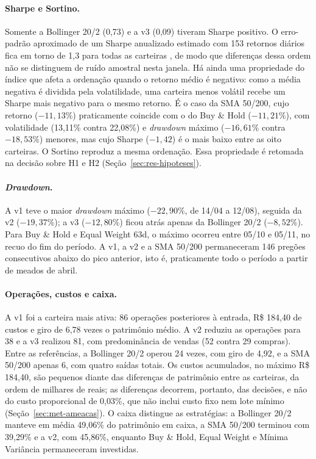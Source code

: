 \documentclass{eic-bcc-tcc}
\begin{document}
\paragraph{Sharpe e Sortino.} Somente a Bollinger 20/2 (0,73) e a v3 (0,09) tiveram Sharpe positivo. O erro-padrão aproximado de um Sharpe anualizado estimado com 153 retornos diários fica em torno de 1,3 para todas as carteiras \citep{Lo2002}, de modo que diferenças dessa ordem não se distinguem de ruído amostral nesta janela. Há ainda uma propriedade do índice que afeta a ordenação quando o retorno médio é negativo: como a média negativa é dividida pela volatilidade, uma carteira menos volátil recebe um Sharpe mais negativo para o mesmo retorno. É o caso da SMA 50/200, cujo retorno ($-11{,}13\%$) praticamente coincide com o do Buy \& Hold ($-11{,}21\%$), com volatilidade (13,11\% contra 22,08\%) e \textit{drawdown} máximo ($-16{,}61\%$ contra $-18{,}53\%$) menores, mas cujo Sharpe ($-1{,}42$) é o mais baixo entre as oito carteiras. O Sortino reproduz a mesma ordenação. Essa propriedade é retomada na decisão sobre H1 e H2 (Seção~\ref{sec:res-hipoteses}).

\paragraph{\textit{Drawdown}.} A v1 teve o maior \textit{drawdown} máximo ($-22{,}90\%$, de 14/04 a 12/08), seguida da v2 ($-19{,}37\%$); a v3 ($-12{,}80\%$) ficou atrás apenas da Bollinger 20/2 ($-8{,}52\%$). Para Buy \& Hold e Equal Weight 63d, o máximo ocorreu entre 05/10 e 05/11, no recuo do fim do período. A v1, a v2 e a SMA 50/200 permaneceram 146 pregões consecutivos abaixo do pico anterior, isto é, praticamente todo o período a partir de meados de abril.

\paragraph{Operações, custos e caixa.} A v1 foi a carteira mais ativa: 86 operações posteriores à entrada, R\$ 184,40 de custos e giro de 6,78 vezes o patrimônio médio. A v2 reduziu as operações para 38 e a v3 realizou 81, com predominância de vendas (52 contra 29 compras). Entre as referências, a Bollinger 20/2 operou 24 vezes, com giro de 4,92, e a SMA 50/200 apenas 6, com quatro saídas totais. Os custos acumulados, no máximo R\$ 184,40, são pequenos diante das diferenças de patrimônio entre as carteiras, da ordem de milhares de reais; as diferenças decorrem, portanto, das decisões, e não do custo proporcional de 0,03\%, que não inclui custo fixo nem lote mínimo (Seção~\ref{sec:met-ameacas}). O caixa distingue as estratégias: a Bollinger 20/2 manteve em média 49,06\% do patrimônio em caixa, a SMA 50/200 terminou com 39,29\% e a v2, com 45,86\%, enquanto Buy \& Hold, Equal Weight e Mínima Variância permaneceram investidas.
\end{document}
